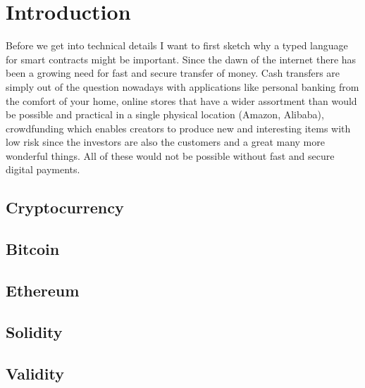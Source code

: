\chapter{Introduction}
\label{introduction}

Before we get into technical details I want to first sketch why a typed
language for smart contracts might be important.
Since the dawn of the internet there has been a growing need for fast and
secure transfer of money.
Cash transfers are simply out of the question nowadays with applications like
personal banking from the comfort of your home, online stores that have a wider
assortment than would be possible and practical in a single physical location
(Amazon, Alibaba), crowdfunding which enables creators to produce new and
interesting items with low risk since the investors are also the customers and
a great many more wonderful things.
All of these would not be possible without fast and secure digital payments.

\section{Cryptocurrency}

\section{Bitcoin}

\section{Ethereum}

\section{Solidity}

\section{Validity}
